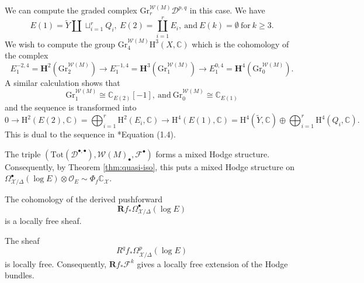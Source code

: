 \begin{instance}
    We can compute the graded complex \(\mathrm{Gr}_{r}^{\mathcal{W}(M)}\mathcal{D}^{p,q}\) in this case. We have
    \begin{equation*}
        E(1) = \tilde{Y}\coprod \sqcup_{i=1}^{r} Q_{i},~E(2) = \coprod_{i=1}^{r} E_{i},~\mbox{and}~E(k)=\emptyset~\mbox{for}~k\ge 3.
    \end{equation*}
    We wish to compute the group \(\mathrm{Gr}^{\mathcal{W}(M)}_{4}\mathrm{H}^{3}(X,\mathbb{C})\)
    which is the cohomology of the complex
    \begin{equation*}
        E_{1}^{-2,4}=\mathbf{H}^{2}(\mathrm{Gr}_{2}^{\mathcal{W}(M)})\to E_{1}^{-1,4}
    =\mathbf{H}^{3}(\mathrm{Gr}_{1}^{\mathcal{W}(M)})\to E_{1}^{0,4}=\mathbf{H}^{4}(\mathrm{Gr}_{0}^{\mathcal{W}(M)}).
    \end{equation*}
    A similar calculation shows that 
    \begin{equation*}
        \mathrm{Gr}_{1}^{\mathcal{W}(M)}\cong \mathbb{C}_{E(2)}[-1],~\mbox{and}~
        \mathrm{Gr}_{0}^{\mathcal{W}(M)}\cong \mathbb{C}_{E(1)}
    \end{equation*}
    and the sequence is transformed into
    \begin{equation*}
        0\to \mathrm{H}^{2}(E(2),\mathbb{C})=\bigoplus_{i=1}^{r}\mathrm{H}^{2}(E_{i},\mathbb{C})
        \to \mathrm{H}^{4}(E(1),\mathbb{C})=\mathrm{H}^{4}(\tilde{Y},\mathbb{C})\oplus 
        \bigoplus_{i=1}^{r}\mathrm{H}^{4}(Q_{i},\mathbb{C}).
    \end{equation*}
    This is dual to the sequence in \cite{2018-Lee-Lin-Wang-towards-A+B-theory-in-conifold-transitions-for-CY-threefolds}*{Equation (1.4)}.
    
\end{instance}

\begin{theorem}
\label{theorem:steenbrink-mhs}
    The triple \((\mathrm{Tot}(\mathcal{D}^{\bullet,\bullet}),\mathcal{W}(M)_{\bullet},\mathcal{F}^{\bullet})\)
    forms a mixed Hodge structure. 
    Consequently, by Theorem \ref{thm:quasi-iso},
    this puts a mixed Hodge structure on 
    \(\Omega^{\bullet}_{\mathcal{X}\slash\Delta}(\log E)\otimes
    \mathscr{O}_{E}\sim \Phi_{f}\mathbb{C}_{\mathcal{X}}\).
\end{theorem}

\begin{corollary}
    The cohomology of the derived pushforward
    \begin{equation*}
        \mathbf{R}f_{\ast} \Omega^{\bullet}_{\mathcal{X}\slash\Delta}(\log E)
    \end{equation*}
    is a locally free sheaf.
\end{corollary}
\begin{corollary}
    The sheaf
    \begin{equation*}
        R^{q}f_{\ast} \Omega^{p}_{\mathcal{X}\slash\Delta}(\log E)
    \end{equation*}
    is locally free. Consequently, 
    \(\mathbf{R}f_{\ast}\mathcal{F}^{k}\) gives a locally free extension of the Hodge bundles.
\end{corollary}



